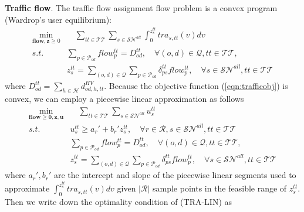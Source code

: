 \documentclass[trsc,nonblindrev]{informs3noheader}
\begin{document}

\textbf{Traffic flow}. The traffic flow assignment flow problem is a convex program (Wardrop's user equilibrium):
\begin{align}
    \min_{\mathbf{flow, z} \geq 0}&\quad \sum_{tt\in \mathcal{TT}} \sum_{s \in \mathcal{SN}^{all}} \int_0^{z_s^{tt}} tra_{s,tt}(v) dv \label{eqn:trafficobj}\\
    s.t. \quad  &  \sum_{p\in \mathcal{P}_{od}} flow_{p}^{tt} = D_{od}^{tt}, \quad \forall (o,d) \in \mathcal{Q}, tt \in \mathcal{TT}, \\
    & z_s^{tt} =  \sum_{(o,d) \in \mathcal{Q}} \sum_{p\in \mathcal{P}_{od}} \delta_{ps}^{tt} flow_{p}^{tt}, \quad \forall s \in \mathcal{SN}^{all}, tt \in \mathcal{TT}
\end{align}
where $D_{od}^{tt} = \sum_{h \in \mathcal{H}} d_{od,h,tt}^{HV}$. Because the objective function (\ref{eqn:trafficobj}) is convex, we can employ a piecewise linear approximation as follows
\begin{align}
\tag{TRA-LIN}
   \min_{\mathbf{flow\geq 0, z, u}}&\quad \sum_{tt\in \mathcal{TT}} \sum_{s \in \mathcal{SN}^{all}} u_s^{tt}  \\
    s.t. \quad  &  u_s^{tt} \geq a_r' + b_r' z_s^{tt},\quad \forall r\in \mathcal{R}, s \in \mathcal{SN}^{all}, tt \in \mathcal{TT} \label{eqn:traffic_constr1}\\
    & \sum_{p\in \mathcal{P}_{od}} flow_{p}^{tt} = D_{od}^{tt}, \quad \forall (o,d) \in \mathcal{Q}, tt \in \mathcal{TT}, \\
    & z_s^{tt} =  \sum_{(o,d) \in \mathcal{Q}} \sum_{p\in \mathcal{P}_{od}} \delta_{ps}^{tt} flow_{p}^{tt}, \quad \forall s \in \mathcal{SN}^{all}, tt \in \mathcal{TT} \label{eqn:traffic_constr3}
\end{align}
where $a_r', b_r'$ are the intercept and slope of the piecewise linear segments used to approximate $\int_0^{z_s^{tt}} tra_{s,tt}(v) dv$ given $|\mathcal{R}|$ sample points in the feasible range of $z_s^{tt}$. Then we write down the optimality condition of (TRA-LIN) as
\end{document}
